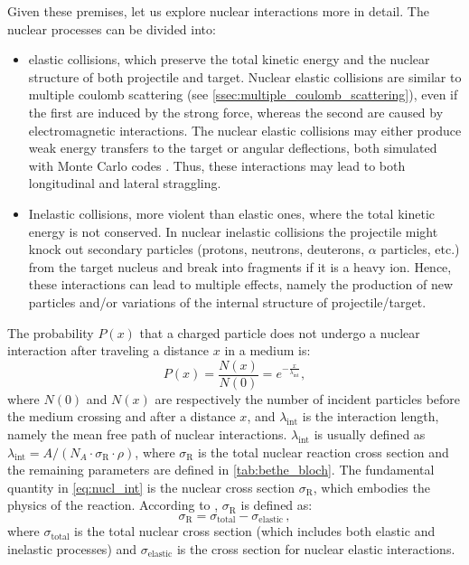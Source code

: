 Given these premises, let us explore nuclear interactions more in detail. The nuclear processes can be divided into:
\begin{itemize}
	\item elastic collisions, which preserve the total kinetic energy and the nuclear structure of both projectile and target. Nuclear elastic collisions are similar to multiple coulomb scattering (see \autoref{ssec:multiple_coulomb_scattering}), even if the first are induced by the strong force, whereas the second are caused by electromagnetic interactions. The nuclear elastic collisions may either produce weak energy transfers to the target or angular deflections, both simulated with Monte Carlo codes \cite{rangeVerification}. Thus, these interactions may lead to both longitudinal and lateral straggling.
	\item Inelastic collisions, more violent than elastic ones, where the total kinetic energy is not conserved. In nuclear inelastic collisions the projectile might knock out secondary particles (protons, neutrons, deuterons, $\alpha$ particles, etc.) from the target nucleus and break into fragments if it is a heavy ion. Hence, these interactions can lead to multiple effects, namely the production of new particles and/or variations of the internal structure of projectile/target.
\end{itemize}
The probability $P(x)$ that a charged particle does not undergo a nuclear interaction after traveling a distance $x$ in a medium is:
\begin{equation}
	P(x)=\frac{N(x)}{N(0)}=e^{-\frac{x}{\lambda_\text{int}}},
	\label{eq:nucl_int}
\end{equation}
where $N(0)$ and $N(x)$ are respectively the number of incident particles before the medium crossing and after a distance $x$, and $\lambda_\text{int}$ is the interaction length, namely the mean free path of nuclear interactions. $\lambda_\text{int}$ is usually defined as $\lambda_\text{int}=A/(N_A\cdot\sigma_\text{R}\cdot\rho)$, where $\sigma_\text{R}$ is the total nuclear reaction cross section and the remaining parameters are defined in \autoref{tab:bethe_bloch}. The fundamental quantity in \autoref{eq:nucl_int} is the nuclear cross section $\sigma_\text{R}$, which embodies the physics of the reaction. According to \cite{Geant4_NucleusNucleusCrossSections}, $\sigma_\text{R}$ is defined as:
\begin{equation}
	\sigma_\text{R}=\sigma_\text{total}-\sigma_\text{elastic}\,,
	\label{eq:nucl_react_def}
\end{equation}
where $\sigma_\text{total}$ is the total nuclear cross section (which includes both elastic and inelastic processes) and $\sigma_\text{elastic}$ is the cross section for nuclear elastic interactions.

